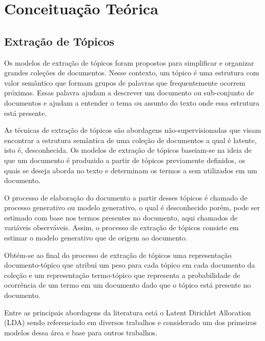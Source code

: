 \chapter{Conceituação Teórica}\label{cap2}



\section{Extração de Tópicos}

Os modelos de extração de tópicos foram propostos para simplificar e organizar grandes coleções de documentos. Nesse contexto, um tópico é uma estrutura com valor semântico que formam grupos de palavras que frequentemente ocorrem próximas. Essas palavra ajudam a descrever um documento ou sub-conjunto de documentos e ajudam a entender o tema ou assunto do texto onde essa estrutura está presente.

As técnicas de extração de tópicos são abordagens não-supervisionadas que visam encontrar a estrutura semântica de uma coleção de documentos a qual é latente, isto é, desconhecida. Os modelos de extração de tópicos baseiam-se na ideia de que um documento é produzido a partir de tópicos previamente definidos, os quais se deseja aborda no texto e determinam os termos a sem utilizados em um documento.

O processo de elaboração do documento a partir desses tópicos é chamado de processo generativo ou modelo generativo, o qual é desconhecido porém, pode ser estimado  com base nos termos presentes no documento, aqui chamados de variáveis observáveis. Assim, o processo de extração de tópicos consiste em estimar o modelo generativo que de origem ao documento.

Obtém-se ao final do processo de extração de tópicos uma representação documento-tópico que atribui um peso para cada tópico em cada documento da coleção e um representação termo-tópico que representa a probabilidade de ocorrência de um termo em um documento dado que o tópico está presente no documento.


Entre as principais abordagens da literatura está o Latent Dirichlet Allocation (LDA) sendo referenciado em diversos trabalhos e considerado um dos primeiros modelos dessa área e base para outros trabalhos. 






















